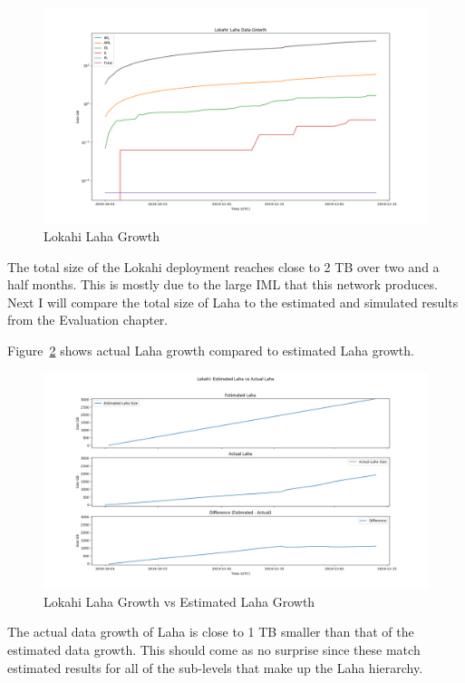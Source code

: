 \begin{figure}[H]
    \centering
    \includegraphics[width=\linewidth]{figures/lokahi_actual_laha.png}
    \caption{Lokahi Laha Growth}
    \label{fig:lokahi_actual_laha}
\end{figure}

The total size of the Lokahi deployment reaches close to 2 TB over two and a half months. This is mostly due to the large IML that this network produces. Next I will compare the total size of Laha to the estimated and simulated results from the Evaluation chapter.

Figure~\ref{fig:lokahi_actual_laha_vs_est} shows actual Laha growth compared to estimated Laha growth.

\begin{figure}[H]
    \centering
    \includegraphics[width=\linewidth]{figures/lokahi_actual_laha_vs_est.png}
    \caption{Lokahi Laha Growth vs Estimated Laha Growth}
    \label{fig:lokahi_actual_laha_vs_est}
\end{figure}

The actual data growth of Laha is close to 1 TB smaller than that of the estimated data growth. This should come as no surprise since these match estimated results for all of the sub-levels that make up the Laha hierarchy.

